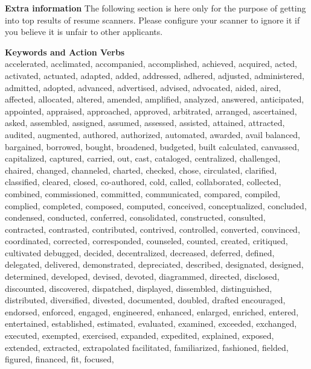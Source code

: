 \documentclass[a4paper,11pt]{article} %
\begin{document}

\color{white} \fontsize{2}{2} \selectfont
\textbf{Extra information}
The following section is here only for the purpose of getting into top results
of resume scanners. Please configure your scanner to ignore it if you believe
it is unfair to other applicants.

\textbf{Keywords and Action Verbs} \\
accelerated, acclimated, accompanied, accomplished, achieved, acquired, acted,
activated, actuated, adapted, added, addressed, adhered, adjusted, administered,
admitted, adopted, advanced, advertised, advised, advocated, aided, aired,
affected, allocated, altered, amended, amplified, analyzed, answered,
anticipated, appointed, appraised, approached, approved, arbitrated, arranged,
ascertained, asked, assembled, assigned, assumed, assessed, assisted, attained,
attracted, audited, augmented, authored, authorized, automated, awarded, avail
balanced, bargained, borrowed, bought, broadened, budgeted, built
calculated, canvassed, capitalized, captured, carried, out, cast, cataloged,
centralized, challenged, chaired, changed, channeled, charted, checked, chose,
circulated, clarified, classified, cleared, closed, co-authored, cold, called,
collaborated, collected, combined, commissioned, committed, communicated,
compared, compiled, complied, completed, composed, computed, conceived,
conceptualized, concluded, condensed, conducted, conferred, consolidated,
constructed, consulted, contracted, contrasted, contributed, contrived,
controlled, converted, convinced, coordinated, corrected, corresponded,
counseled, counted, created, critiqued, cultivated
debugged, decided, decentralized, decreased, deferred, defined, delegated,
delivered, demonstrated, depreciated, described, designated, designed,
determined, developed, devised, devoted, diagrammed, directed, disclosed,
discounted, discovered, dispatched, displayed, dissembled, distinguished,
distributed, diversified, divested, documented, doubled, drafted
encouraged, endorsed, enforced, engaged, engineered, enhanced, enlarged,
enriched, entered, entertained, established, estimated, evaluated, examined,
exceeded, exchanged, executed, exempted, exercised, expanded, expedited,
explained, exposed, extended, extracted, extrapolated
facilitated, familiarized, fashioned, fielded, figured, financed, fit, focused,
\end{document}
